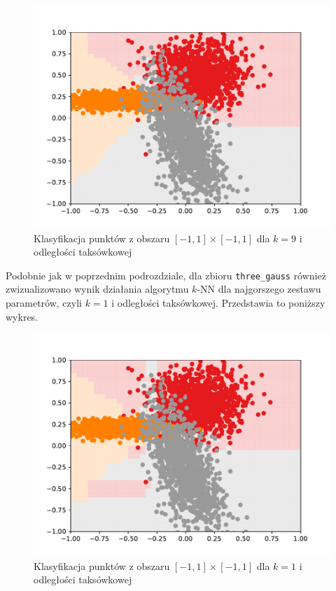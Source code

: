 \documentclass[11pt,a4paper]{article}
\begin{document}
\begin{figure}[H]
  \centering
  \includegraphics[width=.8\textwidth]{res/gauss-manhattan-9.pdf}
  \caption{Klasyfikacja punktów z obszaru $[-1,1] \times [-1,1]$ dla $k = 9$ i odległości taksówkowej}
  \label{fig:gauss-manhattan-9}
\end{figure}

Podobnie jak w poprzednim podrozdziale, dla zbioru {\tt three\_gauss} również zwizualizowano wynik działania algorytmu $k$-NN dla najgorszego zestawu parametrów, czyli $k=1$ i odległości taksówkowej. Przedstawia to poniższy wykres.

\begin{figure}[H]
  \centering
  \includegraphics[width=.8\textwidth]{res/gauss-manhattan-1.pdf}
  \caption{Klasyfikacja punktów z obszaru $[-1,1] \times [-1,1]$ dla $k = 1$ i odległości taksówkowej}
  \label{fig:gauss-manhattan-1}
\end{figure}

\end{document}
